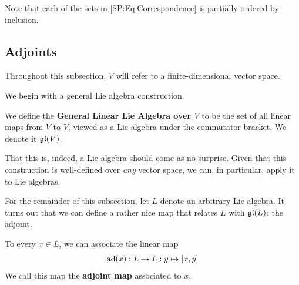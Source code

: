 Note that each of the sets in \eqref{SP:Eq:Correspondence} is partially ordered by inclusion.

\subsection{Adjoints}

Throughout this subsection, $V$ will refer to a finite-dimensional vector space.

We begin with a general Lie algebra construction.

\begin{boxdefinition}\label{Ch1:Def:gl_V}
    We define the \textbf{General Linear Lie Algebra over $V$} to be the set of all linear maps from $V$ to $V$, viewed as a Lie algebra under the commutator bracket. We denote it $\mathfrak{gl}\!\left( V \right)$.
\end{boxdefinition}

That this is, indeed, a Lie algebra should come as no surprise. Given that this construction is well-defined over \textit{any} vector space, we can, in particular, apply it to Lie algebras.

For the remainder of this subsection, let $L$ denote an arbitrary Lie algebra. It turns out that we can define a rather nice map that relates $L$ with $\mathfrak{gl}\!\left( L \right)$: the adjoint.

\begin{boxdefinition}
    To every $x \in L$, we can associate the linear map
    \begin{align*}
        \operatorname{ad}\!\left( x \right) : L \to L : y \mapsto \left[ x, y \right]
    \end{align*}
    We call this map the \textbf{adjoint map} associated to $x$.
\end{boxdefinition}

